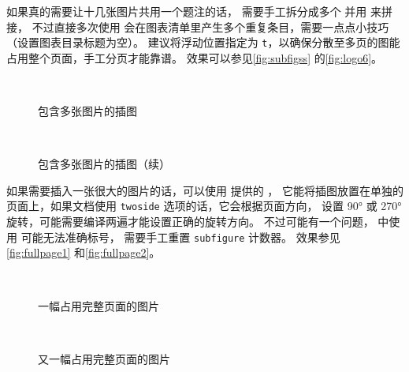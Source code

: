 如果真的需要让十几张图片共用一个题注的话，
需要手工拆分成多个  并用  来拼接，
不过直接多次使用  会在图表清单里产生多个重复条目，需要一点点小技巧
（设置图表目录标题为空）。
建议将浮动位置指定为 \verb|t|，以确保分散至多页的图能占用整个页面，手工分页才能靠谱。
效果可以参见\autoref{fig:subfigss} 的\autoref{fig:logo6}。

\begin{figure}[t]
  \quad
  \\
  \quad
  \caption{包含多张图片的插图}
  \label{fig:subfigss}
\end{figure}
\begin{figure}[t]
  \ContinuedFloat
  \quad
  \\
  \quad
  \caption[]{包含多张图片的插图（续）}
\end{figure}

如果需要插入一张很大的图片的话，可以使用  提供的 ，
它能将插图放置在单独的页面上，如果文档使用 \verb|twoside| 选项的话，它会根据页面方向，
设置 \ang{90} 或 \ang{270} 旋转，可能需要编译两遍才能设置正确的旋转方向。
不过可能有一个问题， 中使用  可能无法准确标号，
需要手工重置 \texttt{subfigure} 计数器。
效果参见\autoref{fig:fullpage1} 和\autoref{fig:fullpage2}。

\setcounter{subfigure}{0}
\begin{sidewaysfigure}
   \\
  \caption{一幅占用完整页面的图片}
  \label{fig:fullpage1}
\end{sidewaysfigure}

\setcounter{subfigure}{0}
\begin{sidewaysfigure}
   \\
  \caption{又一幅占用完整页面的图片}
  \label{fig:fullpage2}
\end{sidewaysfigure}

